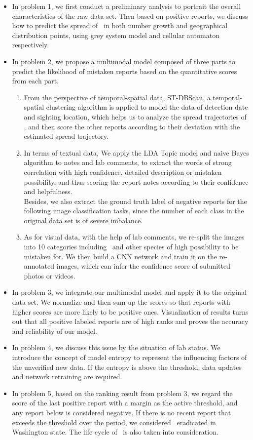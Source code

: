\documentclass{mcmthesis}
\begin{document}
\begin{itemize}
    \item In problem 1, we first conduct a preliminary analysis to portrait the overall characteristics of the raw data set. Then based on positive reports, we discuss how to predict the spread of \VM\ in both number growth and geographical distribution points, using grey system model and cellular automaton respectively.
    \item In problem 2, we propose a multimodal model composed of three parts to predict the likelihood of mistaken reports based on the quantitative scores from each part.
        \begin{enumerate}
            \item From the perspective of temporal-spatial data, ST-DBScan, a temporal-spatial clustering algorithm is applied to model the data of detection date and sighting location, which helps us to analyze the spread trajectories of \VM, and then score the other reports according to their deviation with the estimated spread trajectory.
            \item In terms of textual data, We apply the LDA Topic model and naive Bayes algorithm to notes and lab comments, to extract the words of strong correlation with high confidence, detailed description or mistaken possibility, and thus scoring the report notes according to their confidence and helpfulness. \\
            Besides, we also extract the ground truth label of negative reports for the following image classification tasks, since the number of each class in the original data set is of severe imbalance.
            \item As for visual data, with the help of lab comments, we re-split the images into 10 categories including \VM \ and other species of high possibility to be mistaken for. We then build a CNN network and train it on the re-annotated images, which can infer the confidence score of submitted photos or videos.
        \end{enumerate}
    \item In problem 3, we integrate our multimodal model and apply it to the original data set. We normalize and then sum up the scores so that reports with higher scores are more likely to be positive ones. Visualization of results turns out that all positive labeled reports are of high ranks and proves the accuracy and reliability of our model.
    \item In problem 4, we discuss this issue by the situation of lab status. We introduce the concept of model entropy to represent the influencing factors of the unverified new data. If the entropy is above the threshold, data updates and network retraining are required.
    \item In problem 5, based on the ranking result from problem 3, we regard the score of the last positive report with a margin as the active threshold, and any report below is considered negative. If there is no recent report that exceeds the threshold over the period, we considered \VM \ eradicated in Washington state. The life cycle of \VM\ is also taken into consideration.
\end{itemize}
\end{document}
